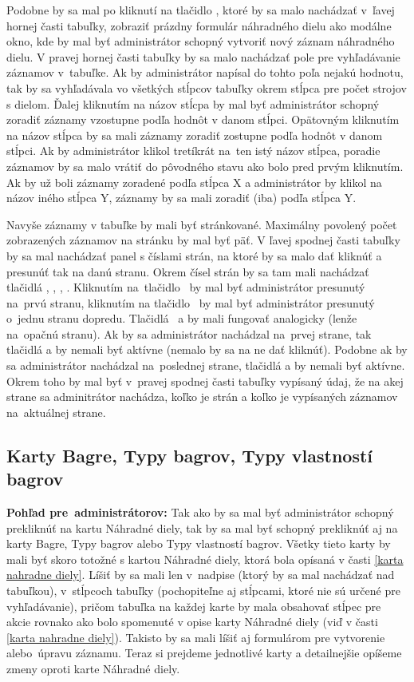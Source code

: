 Podobne by sa mal po kliknutí na tlačidlo , ktoré by sa malo nachádzať v~ľavej hornej časti tabuľky, zobraziť prázdny formulár náhradného dielu ako modálne okno, kde by mal byť administrátor schopný vytvoriť nový záznam náhradného dielu. V pravej hornej časti tabuľky by sa malo nachádzať pole pre vyhľadávanie záznamov v~tabuľke. Ak by administrátor napísal do tohto poľa nejakú hodnotu, tak by sa vyhľadávala vo všetkých stĺpcov tabuľky okrem stĺpca pre počet strojov s dielom. Ďalej kliknutím na názov stĺcpa by mal byť administrátor schopný zoradiť záznamy vzostupne podľa hodnôt v danom stĺpci. Opätovným kliknutím na názov stĺpca by sa mali záznamy zoradiť zostupne podľa hodnôt v danom stĺpci. Ak by administrátor klikol tretíkrát na~ten istý názov stĺpca, poradie záznamov by sa malo vrátiť do pôvodného stavu ako bolo pred prvým kliknutím. Ak by už boli záznamy zoradené podľa stĺpca X a administrátor by klikol na názov iného stĺpca Y, záznamy by sa mali zoradiť (iba) podľa stĺpca Y.

Navyše záznamy v tabuľke by mali byť stránkované. Maximálny povolený počet zobrazených záznamov na stránku by mal byť päť. V ľavej spodnej časti tabuľky by sa mal nachádzať panel s číslami strán, na ktoré by sa malo dať kliknúť a presunúť tak na danú stranu. Okrem čísel strán by sa tam mali nachádzať tlačidlá \uv{<<}, \uv{<}, \uv{>}, \uv{>>}. Kliknutím na~tlačidlo~\uv{<<} by mal byť administrátor presunutý na~prvú stranu, kliknutím na tlačidlo~\uv{<} by mal byť administrátor presunutý o~jednu stranu dopredu. Tlačidlá~\uv{>} a \uv{>>} by mali fungovať analogicky (lenže na~opačnú stranu). Ak by sa administrátor nachádzal na~prvej strane, tak tlačidlá \uv{<<} a \uv{<} by nemali byť aktívne (nemalo by sa na ne dať kliknúť). Podobne ak by sa administrátor nachádzal na~poslednej strane, tlačidlá \uv{>} a \uv{>>} by nemali byť aktívne. Okrem toho by mal byť v~pravej spodnej časti tabuľky vypísaný údaj, že na akej strane sa adminitrátor nachádza, koľko je strán a koľko je vypísaných záznamov na~aktuálnej strane.

\subsection{Karty Bagre, Typy bagrov, Typy vlastností bagrov}
\label{karty bagre typy bagrov typy vlastnosti bagrov}

\textbf{Pohľad pre~administrátorov:} Tak ako by sa mal byť administrátor schopný prekliknúť na kartu Náhradné diely, tak by sa mal byť schopný prekliknúť aj na karty Bagre, Typy bagrov alebo Typy vlastností bagrov. Všetky tieto karty by mali byť skoro totožné s kartou Náhradné diely, ktorá bola opísaná v časti \ref{karta nahradne diely}. Líšiť by sa mali len v~nadpise (ktorý by sa mal nachádzať nad tabuľkou), v~stĺpcoch tabuľky (pochopiteľne aj stĺpcami, ktoré nie sú určené pre vyhľadávanie), pričom tabuľka na každej karte by mala obsahovať stĺpec pre akcie rovnako ako bolo spomenuté v opise karty Náhradné diely (viď v časti \ref{karta nahradne diely}). Takisto by sa mali líšiť aj formulárom pre vytvorenie alebo~úpravu záznamu. Teraz si prejdeme jednotlivé karty a detailnejšie opíšeme zmeny oproti karte Náhradné diely.

